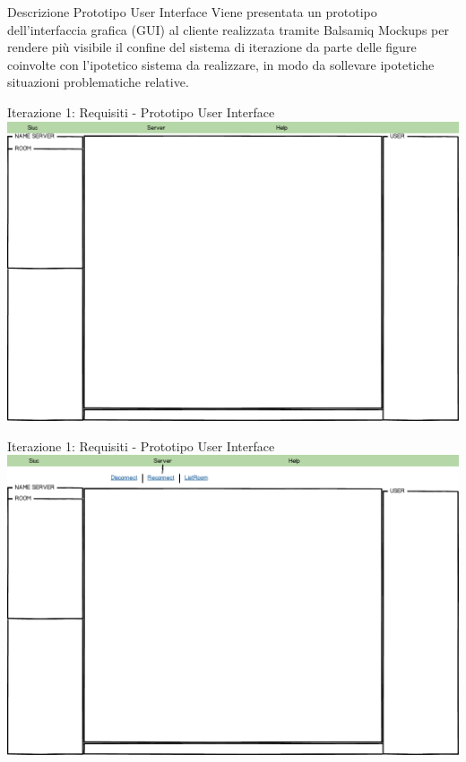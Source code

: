 \begin{frame}{Descrizione Prototipo User Interface}
 Viene presentata un prototipo dell'interfaccia grafica (GUI) al cliente realizzata tramite Balsamiq Mockups per rendere più visibile 
 il confine del sistema di iterazione da parte delle figure coinvolte con l'ipotetico sistema da realizzare, in modo da sollevare
 ipotetiche situazioni problematiche relative. 
\end{frame} 

\begin{frame} {Iterazione 1: Requisiti - Prototipo  User Interface}
    \includegraphics[scale=0.28]{image_mockups/01_snuc_open.png}{\centering}
\end{frame}

\begin{frame} {Iterazione 1: Requisiti - Prototipo User Interface}
    \includegraphics[scale=0.28]{image_mockups/02_snuc_menu_server.png}{\centering}
\end{frame}

